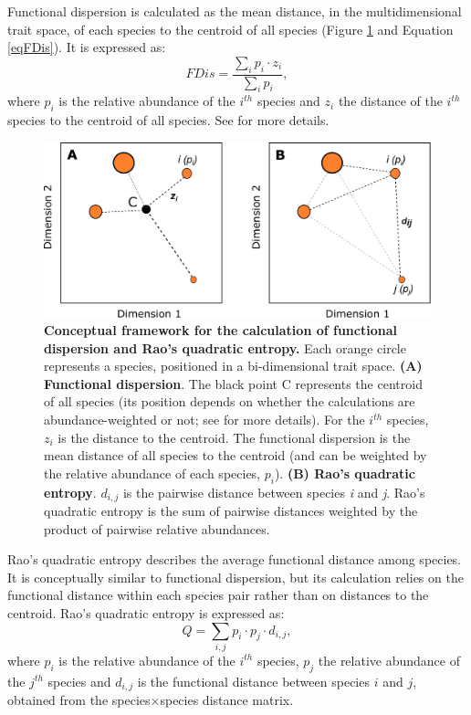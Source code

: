 Functional dispersion is calculated as the mean distance, in the multidimensional trait space, of each species to the centroid of all species (Figure \ref{chartFDis} and Equation \ref{eqFDis}). It is expressed as:
\begin{equation}
FDis=\frac{\sum_{i} p_{i}\cdot z_{i}}{\sum_{i} p_i},
\label{eqFDis}
\end{equation}
where $p_{i}$ is the relative abundance of the $i^{th}$ species and $z_i$ the distance of the $i^{th}$ species to the centroid of all species. See \citet{Laliberte2010} for more details. 

\begin{figure}[h!]
\centering
\includegraphics[scale=0.65]{figures/chapter3/FDis/chartFDis}
\caption[Conceptual framework for the calculation of functional dispersion and Rao's quadratic entropy]{\textbf{Conceptual framework for the calculation of functional dispersion and Rao's quadratic entropy.} Each orange circle represents a species, positioned in a bi-dimensional trait space. \textbf{(A) Functional dispersion}. The black point C represents the centroid of all species (its position depends on whether the calculations are abundance-weighted or not; see for more details). For the $i^{th}$ species, $z_{i}$ is the distance to the centroid. The functional dispersion is the mean distance of all species to the centroid (and can be weighted by the relative abundance of each species, $p_i$).  \textbf{(B) Rao's quadratic entropy}. $d_{i,j}$ is the pairwise distance between species \textit{i} and \textit{j}. Rao's quadratic entropy is the sum of pairwise distances weighted by the product of pairwise relative abundances.}
\label{chartFDis}
\end{figure}

Rao's quadratic entropy describes the average functional distance among species. It is conceptually similar to functional dispersion, but its calculation relies on the functional distance within each species pair rather than on distances to the centroid. Rao's quadratic entropy is expressed as:
\begin{equation}
Q=\sum_{i, j} p_{i}\cdot  p_{j} \cdot d_{i,j}, 
\label{eqFDis}
\end{equation}
where $p_{i}$ is the relative abundance of the $i^{th}$ species, $p_{j}$ the relative abundance of the $j^{th}$ species and $d_{i,j}$ is the functional distance between species $i$ and $j$, obtained from the species$\times$species distance matrix. 

